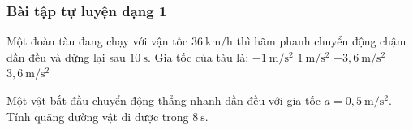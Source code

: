 \subsubsection{Bài tập tự luyện dạng 1}

\begin{ex}
Một đoàn tàu đang chạy với vận tốc $36\ \mathrm{km/h}$ thì hãm phanh chuyển động chậm dần đều và dừng lại sau $10\ \mathrm{s}$. Gia tốc của tàu là:
\choice
{$-1\ \mathrm{m/s^2}$}
{$1\ \mathrm{m/s^2}$}
{$-3{,}6\ \mathrm{m/s^2}$}
{$3{,}6\ \mathrm{m/s^2}$}
\end{ex}

\begin{ex}
Một vật bắt đầu chuyển động thẳng nhanh dần đều với gia tốc $a = 0{,}5\ \mathrm{m/s^2}$. Tính quãng đường vật đi được trong $8\ \mathrm{s}$.
\end{ex}
